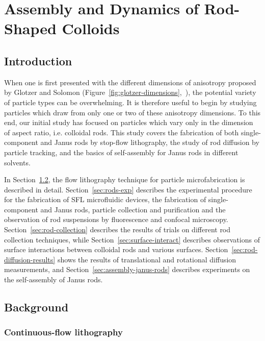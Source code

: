 \chapter{Assembly and Dynamics of Rod-Shaped Colloids}
\label{ch:rods}
\section{Introduction}

When one is first presented with the different dimensions of anisotropy proposed by 
Glotzer and Solomon (Figure~\ref{fig:glotzer-dimensions},~\cite{glotzer-solomon}), the
potential variety of particle types can be overwhelming. It is therefore useful to begin by studying 
particles which draw from only one or two of these anisotropy dimensions. To this end, our
initial study has focused on particles which vary only in the dimension of 
aspect ratio, i.e. colloidal rods. This study covers the fabrication of both single-component and 
Janus rods by stop-flow lithography, the study of rod diffusion by particle tracking, and the basics
of self-assembly for Janus rods in different solvents.

In Section~\ref{sec:rods-background}, the flow lithography technique for particle microfabrication
is described in detail. Section~\ref{sec:rods-exp} describes the experimental procedure for 
the fabrication of SFL microfluidic devices, the fabrication of single-component and Janus rods,
particle collection and purification
and the observation of rod suspensions by fluorescence and confocal microscopy. 
Section~\ref{sec:rod-collection} describes the results of trials on different rod collection
techniques, while Section~\ref{sec:surface-interact} describes observations of 
surface interactions between colloidal rods and various surfaces. Section~\ref{sec:rod-diffusion-results}
shows the results of translational and rotational diffusion measurements, and 
Section~\ref{sec:assembly-janus-rods} describes experiments on the 
self-assembly of Janus rods.

\section{Background}
\label{sec:rods-background}

\subsection{Continuous-flow lithography}

